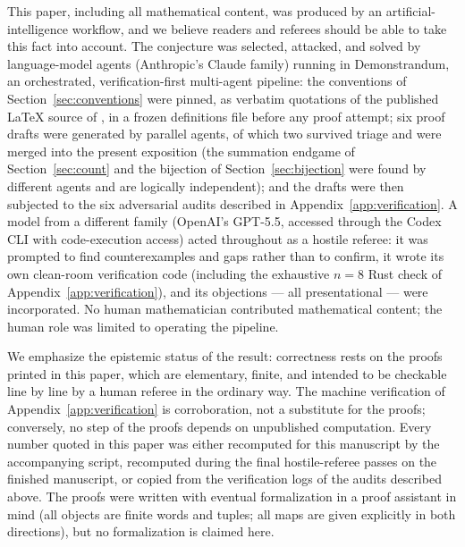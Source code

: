 \documentclass[11pt]{article}
\theoremstyle{definition}
\theoremstyle{remark}
\begin{document}
This paper, including all mathematical content, was produced by an
artificial-intelligence workflow, and we believe readers and referees
should be able to take this fact into account. The conjecture was selected,
attacked, and solved by language-model agents (Anthropic's Claude family)
running in Demonstrandum, an orchestrated, verification-first multi-agent
pipeline: the conventions of
Section~\ref{sec:conventions} were pinned, as verbatim quotations of the
published LaTeX source of \cite{ElizaldeLuo}, in a frozen definitions file
before any proof attempt; six proof drafts
were generated by parallel agents, of which two survived
triage and were merged into the present exposition (the summation endgame
of Section~\ref{sec:count} and the bijection of
Section~\ref{sec:bijection} were found by different agents and are
logically independent); and the drafts were then subjected to the six
adversarial audits described in Appendix~\ref{app:verification}. A model
from a different family (OpenAI's GPT-5.5, accessed through the Codex CLI
with code-execution access) acted throughout as a hostile referee: it was
prompted to find counterexamples and gaps rather than to confirm, it wrote
its own clean-room verification code (including the exhaustive $n=8$ Rust
check of Appendix~\ref{app:verification}), and its objections --- all
presentational --- were incorporated. No human mathematician contributed
mathematical content; the human role was limited to operating the pipeline.

We emphasize the epistemic status of the result: correctness rests on the
proofs printed in this paper, which are elementary, finite, and intended to
be checkable line by line by a human referee in the ordinary way. The
machine verification of Appendix~\ref{app:verification} is corroboration,
not a substitute for the proofs; conversely, no step of the proofs depends
on unpublished computation. Every number quoted in this paper was either
recomputed for this manuscript by the accompanying script, recomputed
during the final hostile-referee passes on the finished manuscript, or
copied from the verification logs of the audits described above. The proofs were
written with eventual formalization in a proof assistant in mind (all
objects are finite words and tuples; all maps are given explicitly in both
directions), but no formalization is claimed here.
\end{document}
